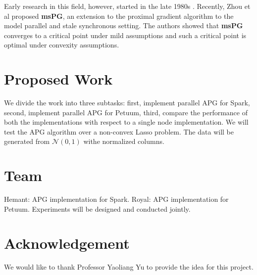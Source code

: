 \documentclass{article}
\begin{document}
Early research in this field, however, started in the late 
1980s \cite{bertsekas1989convergence,bertsekas1989parallel,tseng1991rate,tsitsiklis1984distributed}. 
Recently, Zhou et al proposed \textbf{msPG}, 
an extension to the proximal gradient algorithm to the model parallel and stale synchronous setting\cite{zhou2016convergence}. 
The authors showed that \textbf{msPG} converges to a critical point under mild assumptions 
and such a critical point is optimal under convexity assumptions.

\section{Proposed Work}
We divide the work into three subtasks: first, implement parallel APG for Spark, second, implement parallel APG for Petuum, 
third, compare the performance of both the implementations with respect to a single node implementation.
We will test the APG algorithm over a non-convex Lasso problem.
The data will be generated from $\mathcal{N}(0,1)$ withe normalized columns.
 
\section{Team}
Hemant: APG implementation for Spark.
Royal: APG implementation for Petuum.
Experiments will be designed and conducted jointly.

\section*{Acknowledgement}
We would like to thank Professor Yaoliang Yu to provide the idea for this project.



\end{document}
